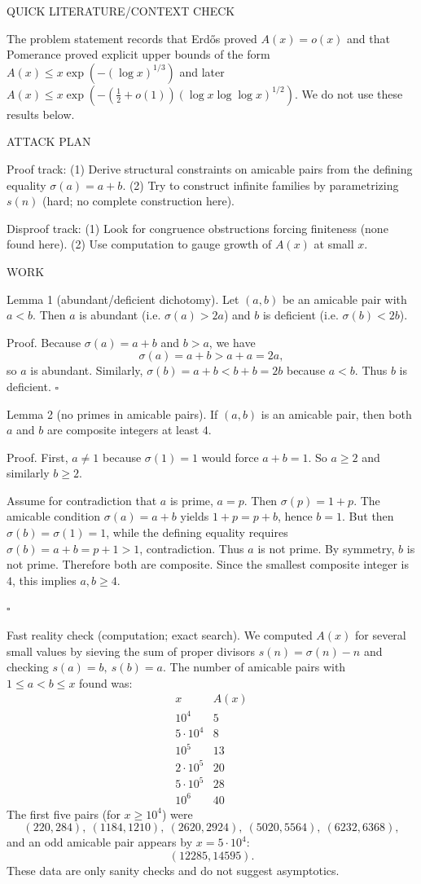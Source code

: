 QUICK LITERATURE/CONTEXT CHECK

The problem statement records that Erd\H{o}s proved $A(x)=o(x)$ and that Pomerance proved explicit upper bounds of the form
$A(x)\le x\exp(- (\log x)^{1/3})$ and later $A(x)\le x\exp(- (\tfrac12+o(1))(\log x\log\log x)^{1/2})$.
We do not use these results below.

ATTACK PLAN

Proof track:
(1) Derive structural constraints on amicable pairs from the defining equality $\sigma(a)=a+b$.
(2) Try to construct infinite families by parametrizing $s(n)$ (hard; no complete construction here).

Disproof track:
(1) Look for congruence obstructions forcing finiteness (none found here).
(2) Use computation to gauge growth of $A(x)$ at small $x$.

WORK

Lemma 1 (abundant/deficient dichotomy).
Let $(a,b)$ be an amicable pair with $a<b$.
Then $a$ is abundant (i.e. $\sigma(a)>2a$) and $b$ is deficient (i.e. $\sigma(b)<2b$).

Proof.
Because $\sigma(a)=a+b$ and $b>a$, we have
\[
\sigma(a)=a+b> a+a =2a,
\]
so $a$ is abundant.
Similarly, $\sigma(b)=a+b < b+b=2b$ because $a<b$.
Thus $b$ is deficient.
$\square$

Lemma 2 (no primes in amicable pairs).
If $(a,b)$ is an amicable pair, then both $a$ and $b$ are composite integers at least $4$.

Proof.
First, $a\ne 1$ because $\sigma(1)=1$ would force $a+b=1$.
So $a\ge 2$ and similarly $b\ge 2$.

Assume for contradiction that $a$ is prime, $a=p$.
Then $\sigma(p)=1+p$.
The amicable condition $\sigma(a)=a+b$ yields $1+p = p+b$, hence $b=1$.
But then $\sigma(b)=\sigma(1)=1$, while the defining equality requires $\sigma(b)=a+b=p+1>1$, contradiction.
Thus $a$ is not prime. By symmetry, $b$ is not prime.
Therefore both are composite.
Since the smallest composite integer is $4$, this implies $a,b\ge 4$.

$\square$

Fast reality check (computation; exact search).
We computed $A(x)$ for several small values by sieving the sum of proper divisors $s(n)=\sigma(n)-n$ and checking $s(a)=b,\ s(b)=a$.
The number of amicable pairs with $1\le a<b\le x$ found was:
\[
\begin{array}{r|r}
 x & A(x) \\\hline
 10^4 & 5\\
 5\cdot 10^4 & 8\\
 10^5 & 13\\
 2\cdot 10^5 & 20\\
 5\cdot 10^5 & 28\\
 10^6 & 40
\end{array}
\]
The first five pairs (for $x\ge 10^4$) were
\[(220,284),\ (1184,1210),\ (2620,2924),\ (5020,5564),\ (6232,6368),\]
and an odd amicable pair appears by $x=5\cdot 10^4$:
\[(12285,14595).
\]
These data are only sanity checks and do not suggest asymptotics.


